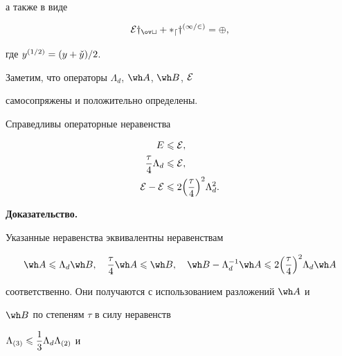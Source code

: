 а также в виде


\begin{equation}


\cal E y_{\ov t}+\Lambda_dy^{(1/2)}=\Phi,


\end{equation}


где $y^{(1/2)}=(y+\Check y)/2$.


Заметим, что операторы $\Lambda_d$, $\wh A $, $\wh B $, $\cal E$ 


самосопряжены и положительно определены.





\begin{lem} Справедливы операторные неравенства


\begin{align}


E&\lee\cal E,\\


\dfrac{\tau}{4}\Lambda_d&\lee\cal E,\\


\cal E-E&\lee 2\Big(\frac{\tau}{4}\Big)^2\Lambda_d^2.


\end{align}


\end{lem}





{\bf Доказательство.}


Указанные неравенства эквивалентны неравенствам


$$


\wh A \lee\Lambda_d\wh B ,\quad \frac{\tau}{4}\wh A \lee\wh B ,\quad


\wh B -\Lambda_d^{-1}\wh A \lee 2\Big(\frac{\tau}{4}\Big)^2\Lambda_d\wh A


$$


соответственно. Они получаются с использованием разложений $\wh A $ и 


$\wh B $ по степеням $\tau$ в силу неравенств


$\Lambda_{(3)}\leqslant\dfrac{1}{3}\Lambda_d\Lambda_{(2)}$ и 


